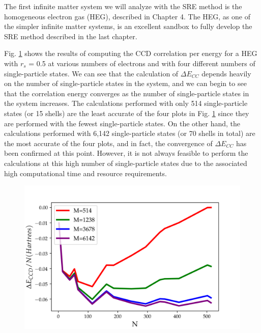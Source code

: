 The first infinite matter system we will analyze with the SRE method is the homogeneous electron gas (HEG), described in Chapter 4. The HEG, as one of the simpler infinite matter systems, is an excellent sandbox to fully develop the SRE method described in the last chapter.



Fig. \ref{increase_m} shows the results of computing the CCD correlation per energy for a HEG with $r_s$ = 0.5 at various numbers of electrons and with four different numbers of single-particle states. We can see that the calculation of $\Delta E_{CC}$ depends heavily on the number of single-particle states in the system, and we can begin to see that the correlation energy converges as the number of single-particle states in the system increases. The calculations performed with only 514 single-particle states (or 15 shells) are the least accurate of the four plots in Fig. \ref{increase_m} since they are performed with the fewest single-particle states. On the other hand, the calculations performed with 6,142 single-particle states (or 70 shells in total) are the most accurate of the four plots, and in fact, the convergence of $\Delta E_{CC}$ has been confirmed at this point. However, it is not always feasible to perform the calculations at this high number of single-particle states due to the associated high computational time and resource requirements.

\begin{figure}
    \includegraphics[scale=0.75]{Images/Chapter7/ElectronGas/Increase_M.png}
    \label{increase_m}
\end{figure}

